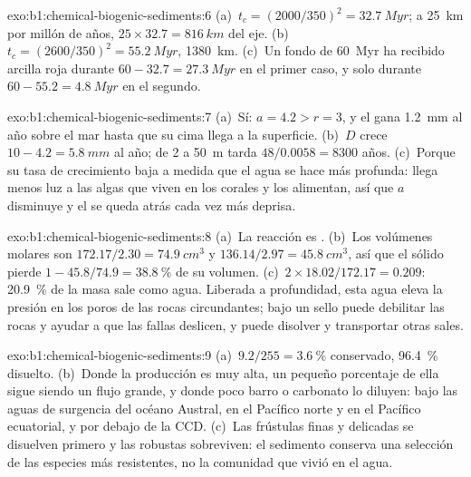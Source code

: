 \begin{solution}{exo:b1:chemical-biogenic-sediments:6}
(a)~$t_c = (2000/350)^2 = \qty{32.7}{Myr}$; a \qty{25}{km} por millón de años, $25\times32.7 = \qty{816}{km}$ del eje. (b)~$t_c = (2600/350)^2 =
\qty{55.2}{Myr}$, \qty{1380}{km}. (c)~Un fondo de \qty{60}{Myr} ha recibido arcilla roja durante $60 - 32.7 = \qty{27.3}{Myr}$ en el primer caso, y solo durante
$60 - 55.2 = \qty{4.8}{Myr}$ en el segundo.
\end{solution}

\begin{solution}{exo:b1:chemical-biogenic-sediments:7}
(a)~Sí: $a = 4.2 > r = 3$, y el  gana \qty{1.2}{mm} al año sobre el mar hasta que su cima llega a la superficie. (b)~$D$ crece $10 - 4.2 = \qty{5.8}{mm}$
al año; de 2 a \qty{50}{m} tarda $48/0.0058 = \num{8300}$ años. (c)~Porque su tasa de crecimiento baja a medida que el agua se hace más profunda: llega menos luz a las
algas que viven en los corales y los alimentan, así que $a$ disminuye y el  se queda atrás cada vez más deprisa.
\end{solution}

\begin{solution}{exo:b1:chemical-biogenic-sediments:8}
(a)~La reacción es . (b)~Los volúmenes molares son $172.17/2.30 =
\qty{74.9}{cm^3}$ y $136.14/2.97 = \qty{45.8}{cm^3}$, así que el sólido pierde $1 - 45.8/74.9 = \qty{38.8}{\%}$ de su volumen. (c)~$2\times18.02/172.17 = 0.209$:
\qty{20.9}{\%} de la masa sale como agua. Liberada a profundidad, esta agua eleva la presión en los poros de las rocas circundantes; bajo un sello puede debilitar las rocas y ayudar
a que las fallas deslicen, y puede disolver y transportar otras sales.
\end{solution}

\begin{solution}{exo:b1:chemical-biogenic-sediments:9}
(a)~$9.2/255 = \qty{3.6}{\%}$ conservado, \qty{96.4}{\%} disuelto. (b)~Donde la producción es muy alta, un pequeño porcentaje de ella sigue siendo un flujo grande, y donde
poco barro o carbonato lo diluyen: bajo las aguas de surgencia del océano Austral, en el Pacífico norte y en el Pacífico ecuatorial, y por debajo de la CCD. (c)~Las frústulas finas y
delicadas se disuelven primero y las robustas sobreviven: el sedimento conserva una selección de las especies más resistentes, no la comunidad que vivió en el agua.
\end{solution}

